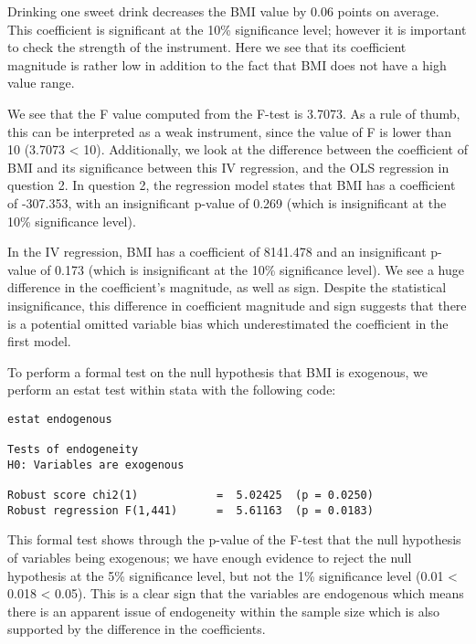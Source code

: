 Drinking one sweet drink decreases the BMI value by 0.06 points on average. This coefficient is significant at the 10\% significance level; however it is important to check the strength of the instrument. Here we see that its coefficient magnitude is rather low in addition to the fact that BMI does not have a high value range.

We see that the F value computed from the F-test is 3.7073. As a rule of thumb, this can be interpreted as a weak instrument, since the value of F is lower than 10 (3.7073 < 10). Additionally, we look at the difference between the coefficient of BMI and its significance between this IV regression, and the OLS regression in question 2. In question 2, the regression model states that BMI has a coefficient of -307.353, with an insignificant p-value of 0.269 (which is insignificant at the 10\% significance level). 

In the IV regression, BMI has a coefficient of 8141.478 and an insignificant p-value of 0.173 (which is insignificant at the 10\% significance level). We see a huge difference in the coefficient's magnitude, as well as sign. Despite the statistical insignificance, this difference in coefficient magnitude and sign suggests that there is a potential omitted variable bias which underestimated the coefficient in the first model.


To perform a formal test on the null hypothesis that BMI is exogenous, we perform an estat test within stata with the following code:

\begin{verbatim}
estat endogenous

Tests of endogeneity
H0: Variables are exogenous

Robust score chi2(1)            =  5.02425  (p = 0.0250)
Robust regression F(1,441)      =  5.61163  (p = 0.0183)
\end{verbatim}

This formal test shows through the p-value of the F-test that the null hypothesis of variables being exogenous; we have enough evidence to reject the null hypothesis at the 5\% significance level, but not the 1\% significance level (0.01 < 0.018 < 0.05). This is a clear sign that the variables are endogenous which means there is an apparent issue of endogeneity within the sample size which is also supported by the difference in the coefficients.